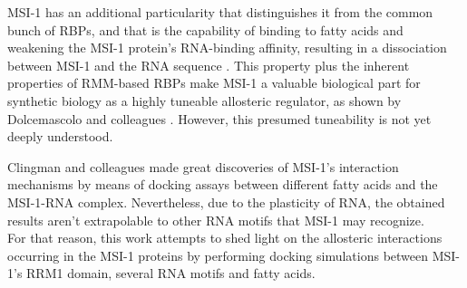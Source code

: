 MSI-1 has an additional particularity that distinguishes it from the common bunch of RBPs, and that is the capability of binding to fatty acids and weakening the MSI-1 protein's RNA-binding affinity, resulting in a dissociation between MSI-1 and the RNA sequence \cite{dolcemascolo_2022,clingman_2014}. This property plus the inherent properties of RMM-based RBPs make MSI-1 a valuable biological part for synthetic biology as a highly tuneable allosteric regulator, as shown by Dolcemascolo and colleagues \cite{dolcemascolo_2022}. However, this presumed tuneability is not yet deeply understood.

\pagebreak

Clingman and colleagues made great discoveries of MSI-1's interaction mechanisms \cite{clingman_2014} by means of docking assays between different fatty acids and the MSI-1-RNA complex. Nevertheless, due to the plasticity of RNA, the obtained results aren't extrapolable to other RNA motifs that MSI-1 may recognize.\\

For that reason, this work attempts to shed light on the allosteric interactions occurring in the MSI-1 proteins by performing docking simulations between MSI-1's RRM1 domain, several RNA motifs and fatty acids.\\
